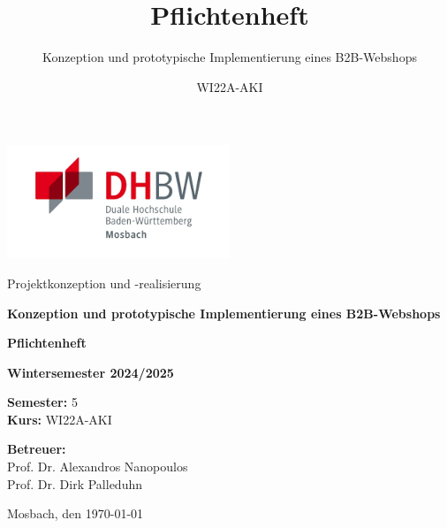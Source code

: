 \documentclass[%
	ngerman,
	12pt,
	a4paper,
	oneside,
	parskip=full
]{scrbook}
\title{Pflichtenheft}
\subtitle{Konzeption und prototypische Implementierung eines B2B-Webshops}
\author{WI22A-AKI}
\begin{document}

\begin{titlepage}
	\centering
	\includegraphics[width=0.5\textwidth]{Media/dhbwlogo.png}\vspace{1cm}

	{\large Projektkonzeption und -realisierung\par}
	\vspace{0.5cm}
	{\Large\bfseries Konzeption und prototypische Implementierung eines B2B-Webshops\par}
	\vspace{1.5cm}

	{\Huge \textbf{Pflichtenheft}\par}
	\vspace{2cm}

	\doublespacing
	{\large \textbf{Wintersemester 2024/2025}\par}
	\textbf{Semester:} 5\\
	\textbf{Kurs:} WI22A-AKI

	{\large\textbf{Betreuer:}\\}
	{\large Prof. Dr. Alexandros Nanopoulos} \\
	{\large Prof. Dr. Dirk Palleduhn}

	\vfill

	Mosbach, den \today  %

\end{titlepage}
\end{document}
